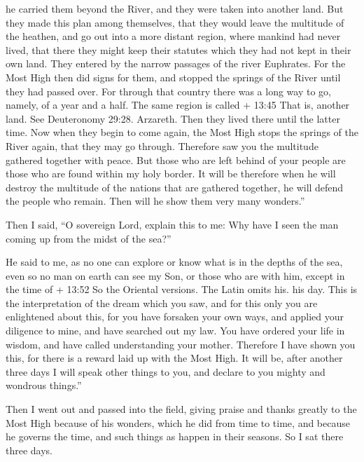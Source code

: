 he carried them beyond the River, and they were taken into another land.
 But they made this plan among themselves, that they would
leave the multitude of the heathen, and go out into a more distant
region, where mankind had never lived,  that there they
might keep their statutes which they had not kept in their own land.
 They entered by the narrow passages of the river
Euphrates.  For the Most High then did signs for them, and
stopped the springs of the River until they had passed over.
 For through that country there was a long way to go,
namely, of a year and a half. The same region is called + 13:45 That is,
another land. See Deuteronomy 29:28. Arzareth.  Then they
lived there until the latter time. Now when they begin to come again,
 the Most High stops the springs of the River again, that
they may go through. Therefore saw you the multitude gathered together
with peace.  But those who are left behind of your people
are those who are found within my holy border.  It will be
therefore when he will destroy the multitude of the nations that are
gathered together, he will defend the people who remain. 
Then will he show them very many wonders.''

 Then I said, ``O sovereign Lord, explain this to me: Why
have I seen the man coming up from the midst of the sea?''

 He said to me, as no one can explore or know what is in
the depths of the sea, even so no man on earth can see my Son, or those
who are with him, except in the time of + 13:52 So the Oriental
versions. The Latin omits his. his day.  This is the
interpretation of the dream which you saw, and for this only you are
enlightened about this,  for you have forsaken your own
ways, and applied your diligence to mine, and have searched out my law.
 You have ordered your life in wisdom, and have called
understanding your mother.  Therefore I have shown you
this, for there is a reward laid up with the Most High. It will be,
after another three days I will speak other things to you, and declare
to you mighty and wondrous things.''

 Then I went out and passed into the field, giving praise
and thanks greatly to the Most High because of his wonders, which he did
from time to time,  and because he governs the time, and
such things as happen in their seasons. So I sat there three days.

